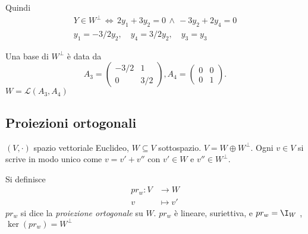 {  Quindi \begin{gather*}Y \in W^{\bot}\,\iff\, 2y_1+3y_2=0\,\land\, -3y_2+2y_4=0\\
y_1=-3/2 y_2, \quad y_4 = 3/2 y_2,\quad y_3 = y_3 \end{gather*}

Una base di $ W^{\bot} $ è data da \[
    A_{3}=\begin{pmatrix}
        -3/2 & 1 \\0 & 3/2
    \end{pmatrix}, A_{4}=\begin{pmatrix}
        0 &0 \\0 &1
    \end{pmatrix} .
\]
$ W= \mathscr{L}(A_3,A_4) $
}{}


\subsection{Proiezioni ortogonali} 

$ (V, \cdot ) $ spazio vettoriale Euclideo, $ W \subseteq V $ sottospazio. $ V=W \oplus W^{\bot} $. Ogni $ v \in V $ si scrive in modo unico come $ v=v'+v'' $ con $ v' \in W $ e $ v'' \in W^{\bot} $.

Si definisce \begin{align*}
    pr_{w}: V& \to W \\
 v & \mapsto v' 
\end{align*}
$ pr_{w} $ si dice la \textit{proiezione ortogonale} su $ W $. $ pr_{w} $ è lineare, suriettiva, e $ pr_{w} = \I_{W}  $%
, $ \ker(pr_{w})= W^{\bot} $


